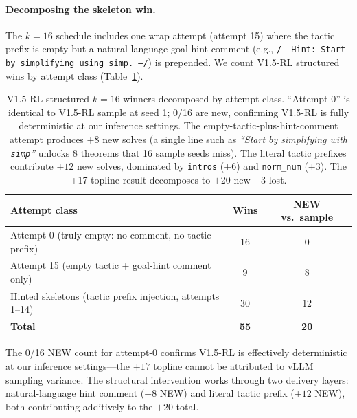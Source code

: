 \documentclass{article}
\begin{document}
\paragraph{Decomposing the skeleton win.}
The $k{=}16$ schedule includes one wrap attempt (attempt 15) where the tactic prefix is empty but a natural-language goal-hint comment (e.g., \texttt{/-- Hint: Start by simplifying using simp. --/}) is prepended. We count V1.5-RL structured wins by attempt class (Table~\ref{tab:attempt_class}).

\begin{table}[h]
\centering
\small
\begin{tabular}{lcc}
\toprule
\textbf{Attempt class} & \textbf{Wins} & \textbf{NEW vs.\ sample} \\
\midrule
Attempt 0 (truly empty: no comment, no tactic prefix)         & 16 & 0  \\
Attempt 15 (empty tactic + goal-hint comment only)             & 9  & 8  \\
Hinted skeletons (tactic prefix injection, attempts 1--14)     & 30 & 12 \\
\midrule
\textbf{Total}                                                 & \textbf{55} & \textbf{20} \\
\bottomrule
\end{tabular}
\caption{V1.5-RL structured $k{=}16$ winners decomposed by attempt class. ``Attempt 0'' is identical to V1.5-RL sample at seed 1; 0/16 are new, confirming V1.5-RL is fully deterministic at our inference settings. The empty-tactic-plus-hint-comment attempt produces $+8$ new solves (a single line such as \emph{``Start by simplifying with \texttt{simp}''} unlocks 8 theorems that 16 sample seeds miss). The literal tactic prefixes contribute $+12$ new solves, dominated by \texttt{intros} ($+6$) and \texttt{norm\_num} ($+3$). The +17 topline result decomposes to $+20$ new $-3$ lost.}
\label{tab:attempt_class}
\end{table}

The 0/16 NEW count for attempt-0 confirms V1.5-RL is effectively deterministic at our inference settings---the $+17$ topline cannot be attributed to vLLM sampling variance. The structural intervention works through two delivery layers: natural-language hint comment ($+8$ NEW) and literal tactic prefix ($+12$ NEW), both contributing additively to the $+20$ total.
\end{document}
